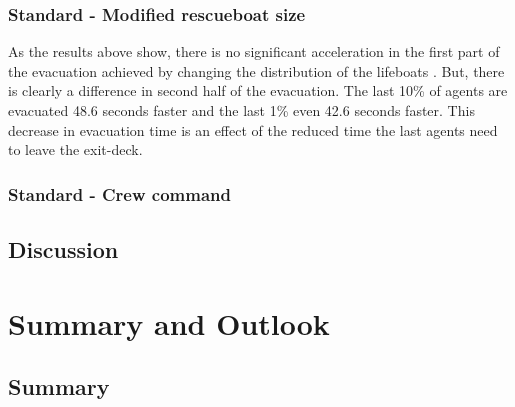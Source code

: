 \documentclass[11pt]{article}
\begin{document}
\subsubsection{Standard - Modified rescueboat size}

As the results above show, there is no significant acceleration in the first part of the evacuation achieved by changing the distribution of the lifeboats .  
 But, there is clearly a difference in second half of the evacuation. The last 10\% of agents are evacuated 48.6 seconds faster and the last 1\% even 42.6 seconds faster. 
This decrease in evacuation time is an effect of the reduced time the last agents need to leave the exit-deck.

\subsubsection{Standard - Crew command}
\subsection{Discussion}
\section{Summary and Outlook}
\subsection{Summary}
\end{document}
